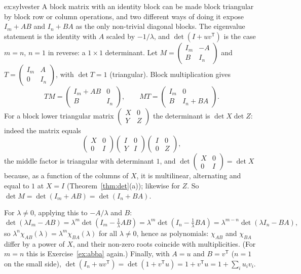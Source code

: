 \begin{solution}{ex:sylvester}
\idea A block matrix with an identity block can be made block triangular by block row or column operations, and two different ways of doing it expose $I_m+AB$ and $I_n+BA$ as the only non-trivial diagonal blocks. The eigenvalue statement is the identity with $A$ scaled by $-1/\lambda$, and $\det(I+uv^{\mathsf T})$ is the case $m=n$, $n=1$ in reverse: a $1\times1$ determinant.
\writeup Let $M=\begin{pmatrix}I_m&-A\\B&I_n\end{pmatrix}$ and $T=\begin{pmatrix}I_m&A\\0&I_n\end{pmatrix}$, with $\det T=1$ (triangular). Block multiplication gives
\[
TM=\begin{pmatrix}I_m+AB&0\\B&I_n\end{pmatrix},\qquad MT=\begin{pmatrix}I_m&0\\B&I_n+BA\end{pmatrix}.
\]
For a block lower triangular matrix $\begin{pmatrix}X&0\\Y&Z\end{pmatrix}$ the determinant is $\det X\det Z$: indeed the matrix equals
\[
\begin{pmatrix}X&0\\0&I\end{pmatrix}\begin{pmatrix}I&0\\Y&I\end{pmatrix}\begin{pmatrix}I&0\\0&Z\end{pmatrix},
\]
the middle factor is triangular with determinant $1$, and $\det\begin{pmatrix}X&0\\0&I\end{pmatrix}=\det X$ because, as a function of the columns of $X$, it is multilinear, alternating and equal to $1$ at $X=I$ (Theorem~\ref{thm:det}(a)); likewise for $Z$. So $\det M=\det(I_m+AB)=\det(I_n+BA)$.

For $\lambda\ne0$, applying this to $-A/\lambda$ and $B$:
\[
\det(\lambda I_m-AB)=\lambda^m\det\left(I_m-\tfrac1\lambda AB\right)=\lambda^m\det\left(I_n-\tfrac1\lambda BA\right)=\lambda^{m-n}\det(\lambda I_n-BA),
\]
so $\lambda^n\chi_{AB}(\lambda)=\lambda^m\chi_{BA}(\lambda)$ for all $\lambda\ne0$, hence as polynomials: $\chi_{AB}$ and $\chi_{BA}$ differ by a power of $X$, and their non-zero roots coincide with multiplicities. (For $m=n$ this is Exercise~\ref{ex:abba} again.) Finally, with $A=u$ and $B=v^{\mathsf T}$ ($n=1$ on the small side), $\det(I_n+uv^{\mathsf T})=\det(1+v^{\mathsf T}u)=1+v^{\mathsf T}u=1+\sum_i u_iv_i$.
\end{solution}

